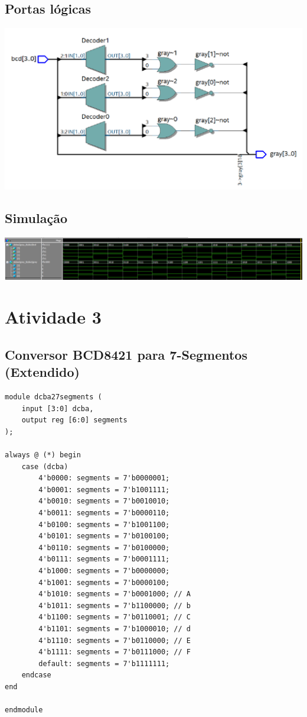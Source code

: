 \documentclass{article}
\begin{document}
\subsection{Portas lógicas}
\includegraphics[width=1\textwidth]{bcd2gray-comportamental-rtl.png}

\subsection{Simulação}
\includegraphics[width=1\textwidth]{bcd2gray-comportamental-wave.png}

\newpage

\setcounter{section}{3}
\setcounter{subsection}{0}
\section*{Atividade 3}

\subsection{Conversor BCD8421 para 7-Segmentos (Extendido)}
\begin{verbatim}
module dcba27segments (
    input [3:0] dcba,
    output reg [6:0] segments 
);

always @ (*) begin
    case (dcba)
        4'b0000: segments = 7'b0000001;
        4'b0001: segments = 7'b1001111;
        4'b0010: segments = 7'b0010010;
        4'b0011: segments = 7'b0000110;
        4'b0100: segments = 7'b1001100;
        4'b0101: segments = 7'b0100100;
        4'b0110: segments = 7'b0100000;
        4'b0111: segments = 7'b0001111;
        4'b1000: segments = 7'b0000000;
        4'b1001: segments = 7'b0000100;
        4'b1010: segments = 7'b0001000; // A
        4'b1011: segments = 7'b1100000; // b
        4'b1100: segments = 7'b0110001; // C
        4'b1101: segments = 7'b1000010; // d
        4'b1110: segments = 7'b0110000; // E
        4'b1111: segments = 7'b0111000; // F
        default: segments = 7'b1111111;
    endcase
end

endmodule
\end{verbatim}
\end{document}
